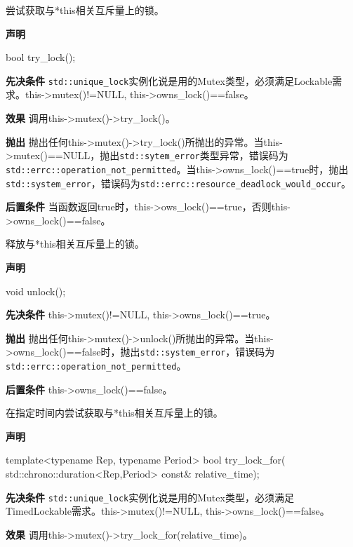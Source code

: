 尝试获取与*this相关互斥量上的锁。

\textbf{声明}

\begin{cpp}
bool try_lock();
\end{cpp}

\textbf{先决条件}
\texttt{std::unique\_lock}实例化说是用的Mutex类型，必须满足Lockable需求。this->mutex()!=NULL, this->owns\_lock()==false。

\textbf{效果}
调用this->mutex()->try\_lock()。

\textbf{抛出}
抛出任何this->mutex()->try\_lock()所抛出的异常。当this->mutex()==NULL，抛出\texttt{std::sytem\_error}类型异常，错误码为\texttt{std::errc::operation\_not\_permitted}。当this->owns\_lock()==true时，抛出\texttt{std::system\_error}，错误码为\texttt{std::errc::resource\_deadlock\_would\_occur}。

\textbf{后置条件}
当函数返回true时，this->ows\_lock()==true，否则this->owns\_lock()==false。


释放与*this相关互斥量上的锁。

\textbf{声明}

\begin{cpp}
void unlock();
\end{cpp}

\textbf{先决条件}
this->mutex()!=NULL, this->owns\_lock()==true。

\textbf{抛出}
抛出任何this->mutex()->unlock()所抛出的异常。当this->owns\_lock()==false时，抛出\texttt{std::system\_error}，错误码为\texttt{std::errc::operation\_not\_permitted}。

\textbf{后置条件}
this->owns\_lock()==false。


在指定时间内尝试获取与*this相关互斥量上的锁。

\textbf{声明}

\begin{cpp}
template<typename Rep, typename Period>
bool try_lock_for(
    std::chrono::duration<Rep,Period> const& relative_time);
\end{cpp}

\textbf{先决条件}
\texttt{std::unique\_lock}实例化说是用的Mutex类型，必须满足TimedLockable需求。this->mutex()!=NULL, this->owns\_lock()==false。

\textbf{效果}
调用this->mutex()->try\_lock\_for(relative\_time)。

